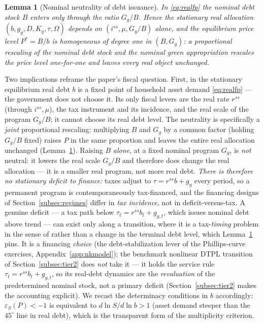 \documentclass[12pt]{article}
\newtheorem{lemma}{Lemma}
\newcommand{\Sfun}{S}
\begin{document}
\begin{lemma}[Nominal neutrality of debt issuance]\label{lem:neutrality}
In \eqref{eq:realfp} the nominal debt stock $B$ enters only through the
ratio $G_g/B$. Hence the stationary real allocation
$(b,g_g,D,K_g,\tau,\Omega)$ depends on $(i^{ss},\mu,G_g/B)$ alone, and the
equilibrium price level $P^{*}=B/b$ is homogeneous of degree one in
$(B,G_g)$: a proportional rescaling of the nominal debt stock and the
nominal green appropriation rescales the price level one-for-one and leaves
every real object unchanged.
\end{lemma}

Two implications reframe the paper's fiscal question. First, in the
stationary equilibrium real debt $b$ is a fixed point of household asset
demand \eqref{eq:realfp} --- the government does not choose it. Its only
fiscal levers are the real rate $r^{ss}$ (through $i^{ss},\mu$), the tax
instrument and its incidence, and the real scale of the program $G_g/B$; it
cannot choose its real debt level. The neutrality is specifically a
\emph{joint} proportional rescaling: multiplying $B$ and $G_g$ by a common
factor (holding $G_g/B$ fixed) raises $P$ in the same proportion and leaves
the entire real allocation unchanged (Lemma~\ref{lem:neutrality}). Raising
$B$ \emph{alone}, at a fixed nominal program $G_g$, is \emph{not} neutral:
it lowers the real scale $G_g/B$ and therefore does change the real
allocation --- it is a smaller real program, not more real debt. \emph{There
is therefore no stationary deficit to finance:} taxes adjust to
$\tau=r^{ss}b+g_g$ every period, so a permanent program is
contemporaneously tax-financed, and the financing designs of
Section~\ref{subsec:regimes} differ in \emph{tax incidence}, not in
deficit-versus-tax. A genuine deficit --- a tax path below
$\tau_t=r^{ss}b_t+g_{g,t}$, which issues nominal debt above trend --- can exist
only along a transition, where it is a tax-\emph{timing} problem in the
sense of \citet{angeletos2024deficits} rather than a change in the terminal
debt level, which Lemma~\ref{lem:neutrality} pins. It is a financing
\emph{choice} (the debt-stabilization lever of the Phillips-curve exercises,
Appendix~\ref{app:nkmodel}); the benchmark nonlinear DTPL transition of
Section~\ref{subsec:tier2} does \emph{not} take it --- it holds the service rule
$\tau_t=r^{ss}b_t+g_{g,t}$, so its real-debt dynamics are the \emph{revaluation}
of the predetermined nominal stock, not a primary deficit
(Section~\ref{subsec:tier2} makes the accounting explicit). We recast the
determinacy conditions in $b$ accordingly: $\varepsilon_S(P)<-1$ is
equivalent to $d\ln\Sfun/d\ln b>1$ (asset demand steeper than the
$45^{\circ}$ line in real debt), which is the transparent form of the
multiplicity criterion.
\end{document}
